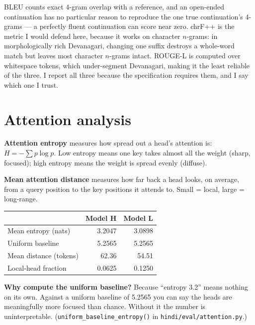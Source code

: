 \documentclass[11pt]{report}
\begin{document}
\begin{shortans}
BLEU counts exact 4-gram overlap with a reference, and an open-ended
continuation has no particular reason to reproduce the one true continuation's
4-grams --- a perfectly fluent continuation can score near zero. chrF++ is the
metric I would defend here, because it works on character $n$-grams: in
morphologically rich Devanagari, changing one suffix destroys a whole-word
match but leaves most character $n$-grams intact. ROUGE-L is computed over
whitespace tokens, which under-segment Devanagari, making it the least reliable
of the three. I report all three because the specification requires them, and I
say which one I trust.
\end{shortans}

\section{Attention analysis}

\textbf{Attention entropy} measures how spread out a head's attention is:
$H = -\sum p \log p$. Low entropy means one key takes almost all the weight
(sharp, focused); high entropy means the weight is spread evenly (diffuse).

\textbf{Mean attention distance} measures how far back a head looks, on average,
from a query position to the key positions it attends to. Small = local,
large = long-range.

\begin{center}\small
\begin{tabular}{lrr}
\toprule
& \textbf{Model H} & \textbf{Model L} \\
\midrule
Mean entropy (nats) & 3.2047 & 3.0898 \\
Uniform baseline & 5.2565 & 5.2565 \\
Mean distance (tokens) & 62.36 & 54.51 \\
Local-head fraction & 0.0625 & 0.1250 \\
\bottomrule
\end{tabular}
\end{center}

\begin{keypoint}
\textbf{Why compute the uniform baseline?} Because ``entropy 3.2'' means nothing
on its own. Against a uniform baseline of 5.2565 you can say the heads are
meaningfully more focused than chance. Without it the number is
uninterpretable. (\texttt{uniform\_baseline\_entropy()} in
\texttt{hindi/eval/attention.py}.)
\end{keypoint}
\end{document}
